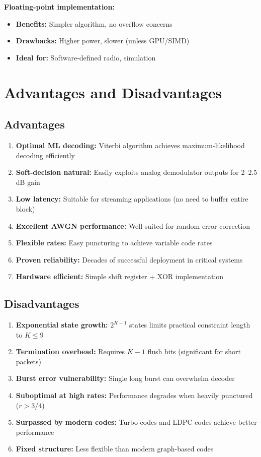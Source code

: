 \textbf{Floating-point implementation:}
\begin{itemize}
\item \textbf{Benefits:} Simpler algorithm, no overflow concerns
\item \textbf{Drawbacks:} Higher power, slower (unless GPU/SIMD)
\item \textbf{Ideal for:} Software-defined radio, simulation
\end{itemize}

\section{Advantages and Disadvantages}

\subsection*{Advantages}

\begin{enumerate}
\item \textbf{Optimal ML decoding:} Viterbi algorithm achieves maximum-likelihood decoding efficiently
\item \textbf{Soft-decision natural:} Easily exploits analog demodulator outputs for 2--2.5 dB gain
\item \textbf{Low latency:} Suitable for streaming applications (no need to buffer entire block)
\item \textbf{Excellent AWGN performance:} Well-suited for random error correction
\item \textbf{Flexible rates:} Easy puncturing to achieve variable code rates
\item \textbf{Proven reliability:} Decades of successful deployment in critical systems
\item \textbf{Hardware efficient:} Simple shift register + XOR implementation
\end{enumerate}

\subsection*{Disadvantages}

\begin{enumerate}
\item \textbf{Exponential state growth:} $2^{K-1}$ states limits practical constraint length to $K \leq 9$
\item \textbf{Termination overhead:} Requires $K-1$ flush bits (significant for short packets)
\item \textbf{Burst error vulnerability:} Single long burst can overwhelm decoder
\item \textbf{Suboptimal at high rates:} Performance degrades when heavily punctured ($r > 3/4$)
\item \textbf{Surpassed by modern codes:} Turbo codes and LDPC codes achieve better performance
\item \textbf{Fixed structure:} Less flexible than modern graph-based codes
\end{enumerate}

